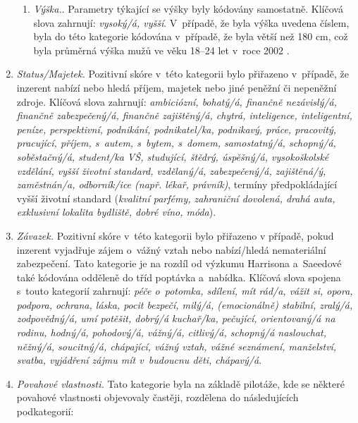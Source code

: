 \documentclass[a4paper, 12pt, notitlepage, oneside, numbers=noenddot]{report}
\begin{document}
\begin{enumerate}
\begin{enumerate}
\item \emph{Výška.}. Parametry týkající se výšky byly kódovány samostatně.
  Klíčová slova zahrnují: \emph{vysoký/á, vyšší}. V~případě, že byla výška
  uvedena číslem, byla do této kategorie kódována v~případě, že byla
  větší než 180 cm, což byla průměrná výška mužů ve věku 18--24 let
  v~roce 2002 \citep{UZIS2002}.
\end{enumerate}
\item \emph{Status/Majetek.} Pozitivní skóre v~této kategorii bylo
  přiřazeno v~případě, že inzerent nabízí nebo hledá příjem, majetek
  nebo jiné peněžní či nepeněžní zdroje. Klíčová slova zahrnují:
  \emph{ambiciózní, bohatý/á, finančně nezávislý/á, finančně
    zabezpečený/á, finančně zajištěný/á, chytrá, inteligence,
    inteligentní, peníze, perspektivní, podnikání, podnikatel/ka,
    podnikavý, práce, pracovitý, pracující, příjem, s~autem, s~bytem,
    s~domem, samostatný/á, schopný/á, soběstačný/á, student/ka VŠ,
    studující, štědrý, úspěšný/á, vysokoškolské vzdělání, vyšší
    životní standard, vzdě\-la\-ný/á, zabezpečený/á, zajištěná/ý,
    zaměstnán/a, odborník/ice (např.  lékař, právník)}, termíny
  předpokládající vyšší životní standard (\emph{kvalitní parfémy,
    zahraniční dovolená, drahá auta, exklusivní lokalita bydliště,
    dobré víno, móda}).
\item \emph{Závazek.} Pozitivní skóre v~této kategorii bylo přiřazeno v
  případě, pokud inzerent vyjadřuje zájem o~vážný vztah nebo
  nabízí/hledá nemateriální zabezpečení. Tato ka\-te\-gorie je na rozdíl
  od výzkumu Harrisona a~Saeedové \citeyearpar{HarrisonSaeed1977} také kódována odděleně do
  tříd poptávka a~nabídka. Klíčová slova spojena s~touto kategorií
  zahrnují: \emph{péče o~potomka, sdílení, mít rád/a, vážit si, opora,
    podpora, ochrana, láska, pocit bezpečí, milý/á, (emocionálně)
    stabilní, zralý/á, zodpovědný/á, umí potěšit, dobrý/á ku\-chař/ka,
    pečující, orientovaný/á na rodinu, hodný/á, pohodový/á, vážný/á,
    citlivý/á, schopný/á naslouchat, něžný/á, soucitný/á, chápající,
    vážný vztah, vážné seznámení, manželství, svatba, vyjádření zájmu
    mít v~budoucnu děti, chápavý/á}.

\item \emph{Povahové vlastnosti.} Tato kategorie byla na základě pilotáže,
  kde se některé povahové vlastnosti objevovaly častěji, rozdělena do
  následujících podkategorií:


\end{enumerate}
\end{document}
